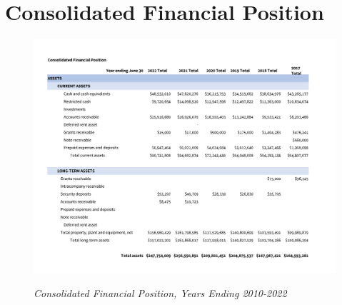 
\chapter{Consolidated Financial Position}\label{ch:consolidated_financial_position}
\begin{figure}[hbt]
    \caption[Consolidated Financial Position, Years Ending 2010–2022]{\textit{Consolidated Financial Position, Years Ending 2010-2022}}\label{fig:consolidated_financial_position_2010-2022-1} %
    \includegraphics[width=\textwidth]{Consolidated Financial Statements/v5 Spreadsheets/Consolidated_Financial_Position_Years_2010-2022 PDF pages/.pg_0001}\\ %
\end{figure}
